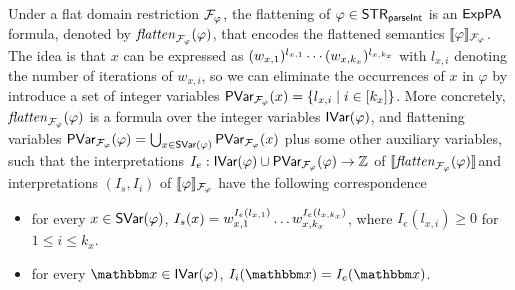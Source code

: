 
Under a flat domain restriction $\mathcal{F}_\varphi$, the flattening of $\varphi \in {\sf STR}_{\textsf{parseInt}}$ is an ${\sf ExpPA}$ formula, denoted by $\mathit{flatten}_{\mathcal{F}_\varphi}(\varphi)$, that encodes the flattened semantics $\llbracket \varphi \rrbracket_{\mathcal{F}_\varphi}$. 
The idea is that $x$ can be expressed as $(w_{x,1})^{l_{x,1}} \cdots (w_{x, k_x})^{l_{x,k_x}}$ with $l_{x,i}$ denoting the number of iterations of $w_{x,i}$,  
so we can eliminate the occurrences of $x$ in $\varphi$ by introduce a set of integer variables $\textsf{PVar}_{\mathcal{F}_\varphi}(x) = \{l_{x,i} \mid i \in [k_x]\}$. 
More concretely, $\mathit{flatten}_{\mathcal{F}_\varphi}(\varphi)$ is a formula over the integer variables $\textsf{IVar}(\varphi)$,  and flattening variables $\textsf{PVar}_{\mathcal{F}_\varphi}(\varphi) = \bigcup_{x \in \textsf{SVar}(\varphi)} \textsf{PVar}_{\mathcal{F}_\varphi}(x)$ plus some other auxiliary variables, such that the interpretations $I_e: \textsf{IVar}(\varphi) \cup \textsf{PVar}_{\mathcal{F}_\varphi}(\varphi) \rightarrow \mathbb Z$ of $\llbracket \mathit{flatten}_{\mathcal{F}_\varphi}(\varphi) \rrbracket$and interpretations $(I_s, I_i)$ of $\llbracket \varphi \rrbracket_{\mathcal{F}_\varphi}$ have the following correspondence 

\begin{itemize}
    \item  
    for every $ x \in \textsf{SVar}(\varphi)$, $I_s(x) = w_{x,1}^{I_e(l_{x,1})} \ldots  w_{x,k_x}^{I_e(l_{x,k_x})}$, where $I_e(l_{x,i})\ge 0$ for $1\le i\le k_x$.
    \item for every $ \ivarx \in \ivar(\varphi)$, $I_i(\ivarx) = I_e(\ivarx)$.
\end{itemize}

